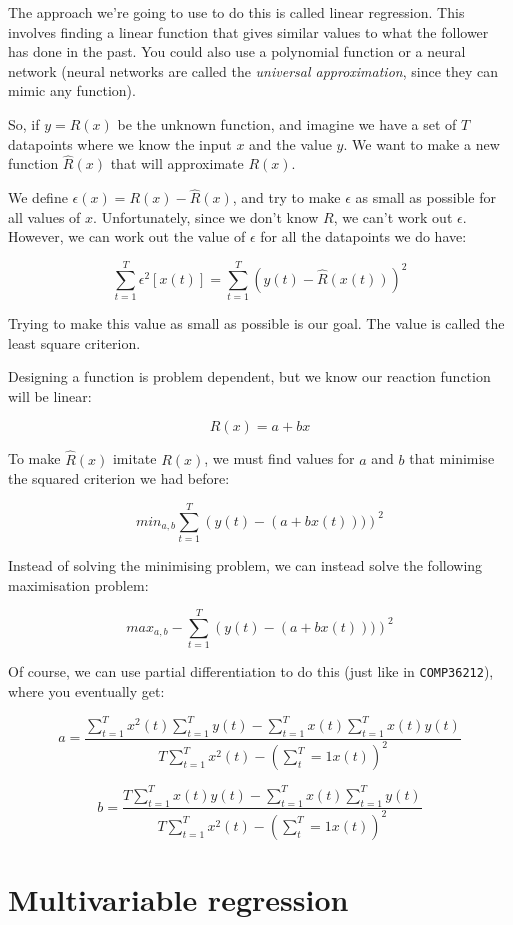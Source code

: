 The approach we're going to use to do this is called linear regression. This
involves finding a linear function that gives similar values to what the
follower has done in the past. You could also use a polynomial function or a
neural network (neural networks are called the \textit{universal approximation},
since they can mimic any function).

So, if $y = R(x)$ be the unknown function, and imagine we have a set of $T$
datapoints where we know the input $x$ and the value $y$. We want to make a new
function $\hat{R}(x)$ that will approximate $R(x)$.

We define $\epsilon(x) = R(x) - \hat{R}(x)$, and try to make $\epsilon$ as small
as possible for all values of $x$. Unfortunately, since we don't know $R$, we
can't work out $\epsilon$. However, we can work out the value of $\epsilon$ for
all the datapoints we do have:

\[
  \sum^T_{t=1}\epsilon^2[x(t)] = \sum^T_{t=1}\left(y(t) - \hat{R}(x(t))\right)^2
\]

Trying to make this value as small as possible is our goal. The value is called
the least square criterion.

Designing a function is problem dependent, but we know our reaction function
will be linear:

\[
  R(x) = a + bx
\]

To make $\hat{R}(x)$ imitate $R(x)$, we must find values for $a$ and $b$ that
minimise the squared criterion we had before:

\[
  min_{a,b} \sum^T_{t=1}\left(y(t) - (a + b x(t)))\right)^2
\]

Instead of solving the minimising problem, we can instead solve the following
maximisation problem:

\[
  max_{a,b} - \sum^T_{t=1}\left(y(t) - (a + b x(t)))\right)^2
\]

Of course, we can use partial differentiation to do this (just like in
\texttt{COMP36212}), where you eventually get:

\[
  a = \frac{
    \sum^T_{t=1}x^2(t)\sum^T_{t=1}y(t) - \sum^T_{t=1}x(t)\sum^T_{t=1}x(t)y(t)
  }{
    T\sum^T_{t=1}x^2(t) - (\sum^T_t{=1}x(t))^2
  }
\]

\[
  b = \frac{
    T\sum^T_{t=1}x(t)y(t) - \sum^T_{t=1}x(t)\sum^T_{t=1}y(t)
  }{
    T\sum^T_{t=1}x^2(t) - (\sum^T_t{=1}x(t))^2
  }
\]


\section{Multivariable regression}

